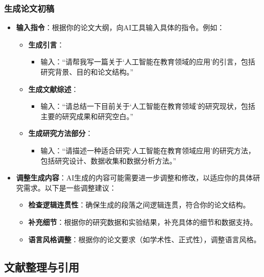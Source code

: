 \subsubsection{生成论文初稿}
\begin{itemize}
    \item \textbf{输入指令}：根据你的论文大纲，向AI工具输入具体的指令。例如：
    \begin{itemize}
        \item \textbf{生成引言}：
        \begin{itemize}
            \item 输入：“请帮我写一篇关于‘人工智能在教育领域的应用’的引言，包括研究背景、目的和论文结构。”
        \end{itemize}
        \item \textbf{生成文献综述}：
        \begin{itemize}
            \item 输入：“请总结一下目前关于‘人工智能在教育领域’的研究现状，包括主要的研究成果和研究空白。”
        \end{itemize}
        \item \textbf{生成研究方法部分}：
        \begin{itemize}
            \item 输入：“请描述一种适合研究‘人工智能在教育领域应用’的研究方法，包括研究设计、数据收集和数据分析方法。”
        \end{itemize}
    \end{itemize}
    \item \textbf{调整生成内容}：AI生成的内容可能需要进一步调整和修改，以适应你的具体研究需求。以下是一些调整建议：
    \begin{itemize}
        \item \textbf{检查逻辑连贯性}：确保生成的段落之间逻辑连贯，符合你的论文结构。
        \item \textbf{补充细节}：根据你的研究数据和实验结果，补充具体的细节和数据支持。
        \item \textbf{语言风格调整}：根据你的论文要求（如学术性、正式性），调整语言风格。
    \end{itemize}
\end{itemize}

\subsection{文献整理与引用}
